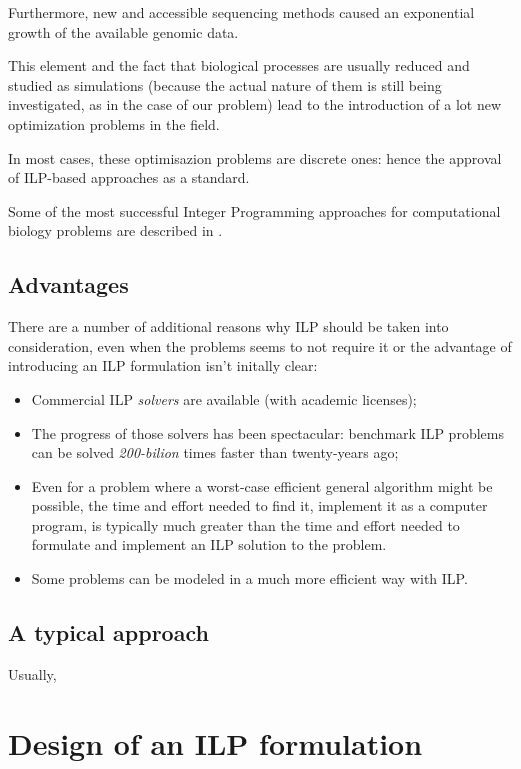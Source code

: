Furthermore, new and accessible sequencing methods caused an exponential growth of the available genomic data.

This element and the fact that biological processes are usually reduced and studied as simulations (because the actual nature of them is still being investigated, as in the case of our problem) lead to the introduction of a lot new optimization problems in the field.

In most cases, these optimisazion problems are discrete ones: hence the approval of ILP-based approaches as a standard.

Some of the most successful Integer Programming approaches for computational biology problems are described in \cite{lancia2004}.

\subsection{Advantages}

There are a number of additional reasons why ILP should be taken into consideration, even when the problems seems to not require it or the advantage of introducing an ILP formulation isn't initally clear\cite{gusfieldilp}:

\begin{itemize}
	\item Commercial ILP \textit{solvers} are available (with academic licenses);
	\item The progress of those solvers has been spectacular: benchmark ILP problems can be solved \textit{200-bilion} times faster than twenty-years ago;
	\item Even for a problem where a worst-case efficient general algorithm might be possible, the time and effort needed to find it, implement it as a computer program, is typically much greater than the time and effort needed to formulate and implement an ILP solution to the problem.
	\item Some problems can be modeled in a much more efficient way with ILP.
\end{itemize}


\subsection{A typical approach}
Usually, 

\section{Design of an ILP formulation}

